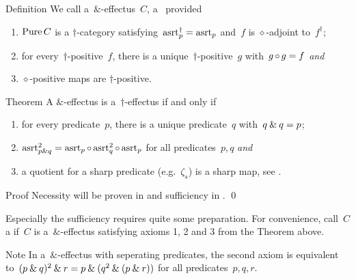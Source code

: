 \documentclass[b]{subfiles}
\begin{document}
\begin{parsec}%
\begin{point}{Definition}%
We call a~$\&$-effectus~$C$,
    a~ provided
\begin{enumerate}
\item
    $\operatorname{Pure} C$ is a  $\dagger$-category
     satisfying~$\mathrm{asrt}_p^\dagger = \mathrm{asrt}_p$
        and~$f$ is $\diamond$-adjoint to~$f^\dagger$;
\item
    for every~$\dagger$-positive~$f$,
        there is a unique~$\dagger$-positive~$g$
        with~$g \mathop{\circ} g = f$ \emph{and}
\item
    $\diamond$-positive maps are $\dagger$-positive.
\end{enumerate}
\end{point}
\begin{point}{Theorem}%
    A $\&$-effectus
        is a~$\dagger$-effectus if and only if
\begin{enumerate}
\item
for every predicate~$p$, there is a unique predicate~$q$
    with~$q \mathbin{\&} q = p$;
\item
    $\mathrm{asrt}^2_{p \mathbin{\&} q}
        = \mathrm{asrt}_p \mathop{\circ} \mathrm{asrt}^2_q \mathop{\circ} \mathrm{asrt}_p$
     for all predicates~$p,q$ \emph{and}
\item
    a quotient for a sharp predicate (e.g.~$\zeta_s$)
    is a sharp map, see .
\end{enumerate}
\begin{point}{Proof}%
Necessity will be proven in
        and sufficiency in . \qed
\end{point}
\begin{point}%
Especially the sufficiency requires quite some preparation.
For convenience, call~$C$ a 
    if~$C$ is a~$\&$-effectus
    satisfying axioms 1, 2 and 3 from the Theorem above.
\end{point}
\begin{point}{Note}%
    In a~$\&$-effectus
    with seperating predicates,
    the second axiom is equivalent
    to~$(p \mathbin{\&} q)^2 \mathbin{\&} r
    = p \mathbin{\&} (q^2 \mathbin{\&} (p \mathbin{\&} r))$
    for all predicates~$p,q,r$.
\end{point}
\end{point}
\end{parsec}
\end{document}
